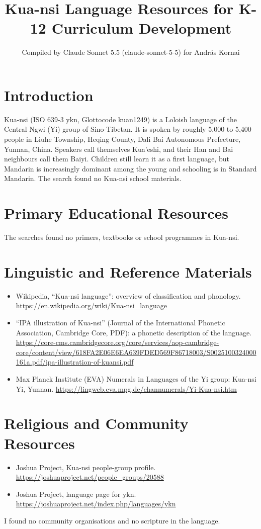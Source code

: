 \documentclass[12pt]{article}
\title{Kua-nsi Language Resources for K-12 Curriculum Development}
\author{Compiled by Claude Sonnet 5.5 (claude-sonnet-5-5) for Andr\'as Kornai}
\date{}
\begin{document}
\maketitle

\section{Introduction}
Kua-nsi (ISO 639-3 ykn, Glottocode kuan1249) is a Loloish language of the Central Ngwi (Yi) group of Sino-Tibetan. It is spoken by roughly 5,000 to 5,400 people in Liuhe Township, Heqing County, Dali Bai Autonomous Prefecture, Yunnan, China. Speakers call themselves Kua'eshi, and their Han and Bai neighbours call them Baiyi. Children still learn it as a first language, but Mandarin is increasingly dominant among the young and schooling is in Standard Mandarin. The search found no Kua-nsi school materials.

\section{Primary Educational Resources}
The searches found no primers, textbooks or school programmes in Kua-nsi.

\section{Linguistic and Reference Materials}
\begin{itemize}
\item Wikipedia, ``Kua-nsi language'': overview of classification and phonology. \url{https://en.wikipedia.org/wiki/Kua-nsi_language}
\item ``IPA illustration of Kua-nsi'' (Journal of the International Phonetic Association, Cambridge Core, PDF): a phonetic description of the language. \url{https://core-cms.cambridgecore.org/core/services/aop-cambridge-core/content/view/618FA2E06E6EA639FDED569F86718003/S0025100324000161a.pdf/ipa-illustration-of-kuansi.pdf}
\item Max Planck Institute (EVA) Numerals in Languages of the Yi group: Kua-nsi Yi, Yunnan. \url{https://lingweb.eva.mpg.de/channumerals/Yi-Kua-nsi.htm}
\end{itemize}

\section{Religious and Community Resources}
\begin{itemize}
\item Joshua Project, Kua-nsi people-group profile. \url{https://joshuaproject.net/people_groups/20588}
\item Joshua Project, language page for ykn. \url{https://joshuaproject.net/index.php/languages/ykn}
\end{itemize}
I found no community organisations and no scripture in the language.
\end{document}
